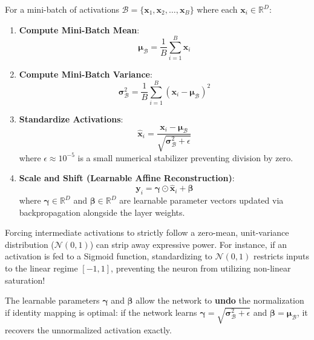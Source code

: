 For a mini-batch of activations $\mathcal{B} = \{\mathbf{x}_1, \mathbf{x}_2, \dots, \mathbf{x}_B\}$ where each $\mathbf{x}_i \in \mathbb{R}^D$:
\begin{enumerate}
    \item \textbf{Compute Mini-Batch Mean}:
    \begin{equation}
    \boldsymbol{\mu}_{\mathcal{B}} = \frac{1}{B} \sum_{i=1}^B \mathbf{x}_i\label{eq:bn_mean}
    \end{equation}
    \item \textbf{Compute Mini-Batch Variance}:
    \begin{equation}
    \boldsymbol{\sigma}_{\mathcal{B}}^2 = \frac{1}{B} \sum_{i=1}^B (\mathbf{x}_i - \boldsymbol{\mu}_{\mathcal{B}})^2\label{eq:bn_var}
    \end{equation}
    \item \textbf{Standardize Activations}:
    \begin{equation}
    \hat{\mathbf{x}}_i = \frac{\mathbf{x}_i - \boldsymbol{\mu}_{\mathcal{B}}}{\sqrt{\boldsymbol{\sigma}_{\mathcal{B}}^2 + \epsilon}}\label{eq:bn_standardize}
    \end{equation}
    where $\epsilon \approx 10^{-5}$ is a small numerical stabilizer preventing division by zero.
    \item \textbf{Scale and Shift (Learnable Affine Reconstruction)}:
    \begin{equation}
    \mathbf{y}_i = \boldsymbol{\gamma} \odot \hat{\mathbf{x}}_i + \boldsymbol{\beta}\label{eq:bn_affine}
    \end{equation}
    where $\boldsymbol{\gamma} \in \mathbb{R}^D$ and $\boldsymbol{\beta} \in \mathbb{R}^D$ are learnable parameter vectors updated via backpropagation alongside the layer weights.
\end{enumerate}

\begin{keyidea}
Forcing intermediate activations to strictly follow a zero-mean, unit-variance distribution ($\mathcal{N}(0, 1)$) can strip away expressive power. For instance, if an activation is fed to a Sigmoid function, standardizing to $\mathcal{N}(0, 1)$ restricts inputs to the linear regime $[-1, 1]$, preventing the neuron from utilizing non-linear saturation!

The learnable parameters $\boldsymbol{\gamma}$ and $\boldsymbol{\beta}$ allow the network to \textbf{undo} the normalization if identity mapping is optimal: if the network learns $\boldsymbol{\gamma} = \sqrt{\boldsymbol{\sigma}_{\mathcal{B}}^2 + \epsilon}$ and $\boldsymbol{\beta} = \boldsymbol{\mu}_{\mathcal{B}}$, it recovers the unnormalized activation exactly.
\end{keyidea}

